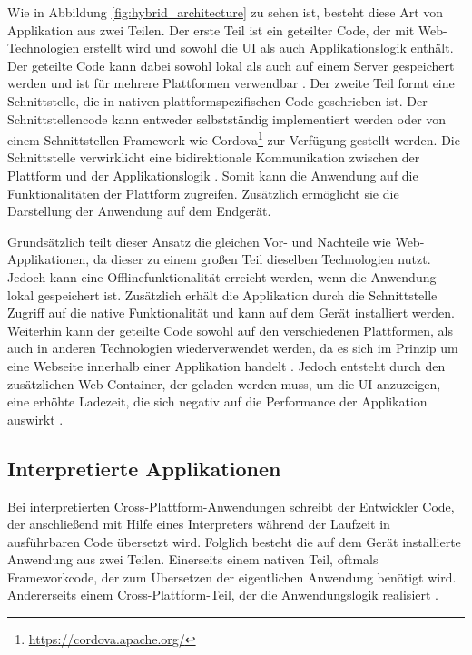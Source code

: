 Wie in Abbildung \ref{fig:hybrid_architecture} zu sehen ist, besteht diese Art von Applikation aus zwei Teilen.
Der erste Teil ist ein geteilter Code, der mit Web-Technologien erstellt wird und sowohl die UI als auch Applikationslogik enthält. Der geteilte Code kann dabei sowohl lokal als auch auf einem Server gespeichert werden und ist für mehrere Plattformen verwendbar \cite{2017hybrid_approach_end}.
Der zweite Teil formt eine Schnittstelle, die in nativen plattformspezifischen Code geschrieben ist. Der Schnittstellencode kann entweder selbstständig implementiert werden oder von einem Schnittstellen-Framework wie Cordova\footnote{\url{https://cordova.apache.org/}} zur Verfügung gestellt werden. Die Schnittstelle verwirklicht eine bidirektionale Kommunikation zwischen der Plattform und der Applikationslogik \cite{ELKASSAS2017163}. Somit kann die Anwendung auf die Funktionalitäten der Plattform zugreifen. Zusätzlich ermöglicht sie die Darstellung der Anwendung auf dem Endgerät. 

Grundsätzlich teilt dieser Ansatz die gleichen Vor- und Nachteile wie Web-Applikationen, da dieser zu einem großen Teil dieselben Technologien nutzt. Jedoch kann eine Offlinefunktionalität erreicht werden, wenn die Anwendung lokal gespeichert ist. Zusätzlich erhält die Applikation durch die Schnittstelle Zugriff auf die native Funktionalität und kann auf dem Gerät installiert werden. Weiterhin kann der geteilte Code sowohl auf den verschiedenen Plattformen, als auch in anderen Technologien wiederverwendet werden, da es sich im Prinzip um eine Webseite innerhalb einer Applikation handelt \cite{IEEE_development_classes}. Jedoch entsteht durch den zusätzlichen Web-Container, der geladen werden muss, um die UI anzuzeigen, eine erhöhte Ladezeit, die sich negativ auf die Performance der Applikation auswirkt \cite{IEEE_development_classes}.

\subsection{Interpretierte Applikationen}
\label{cha:3_2_interpretiert}
Bei interpretierten Cross-Plattform-Anwendungen schreibt der Entwickler Code, der anschließend mit Hilfe eines Interpreters während der Laufzeit in ausführbaren Code übersetzt wird. Folglich besteht die auf dem Gerät installierte Anwendung aus zwei Teilen. Einerseits einem nativen Teil, oftmals Frameworkcode, der zum Übersetzen der eigentlichen Anwendung benötigt wird. Andererseits einem Cross-Plattform-Teil, der die Anwendungslogik realisiert \cite{IEEE_development_classes}.

